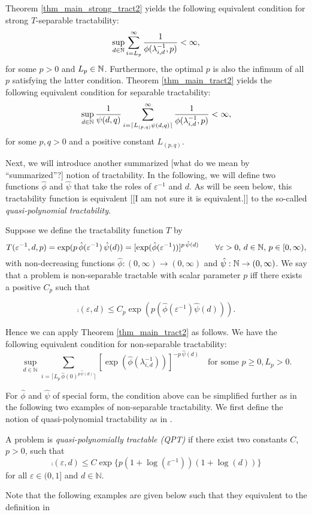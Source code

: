 \documentclass[sort&compress]{elsarticle}
\newcommand{\peter}[1]{\begingroup\color{violet}#1\endgroup}
\newcommand{\kachi}[1]{\begingroup\color{ForestGreen}#1\endgroup}
\begin{document}
\begin{example}
Theorem \ref{thm_main_strong_tract2} yields the following equivalent condition for strong $T$-separable tractability:
\begin{equation*} \label{eq:strong_tractiff}
     \sup_{d \in \mathbb{N}} \sum_{i = L_p}^\infty \frac{1}{\phi(\lambda_{i, d}^{-1},p)} < \infty,
\end{equation*}
for some $p>0$ and $L_p \in \mathbb{N}$. Furthermore, the optimal $p$ is also the infimum of all $p$ satisfying the latter condition.
Theorem \ref{thm_main_tract2} yields the following equivalent condition for separable tractability:
\[
 \sup_{d \in \mathbb{N}} \frac{1}{\psi(d,q)} \sum_{i = \lceil L_{(p,q)}\psi(d,q)\rceil}^\infty \frac{1}{\phi(\lambda_{i, d}^{-1},p)} < \infty,
\] for some $p,q >0$ and a positive constant $L_{(p,q)}$.
\end{example}
\kachi{Next, we will introduce another summarized \peter{[what do we mean by ``summarized''?]} notion of tractability. In the following, we will define two functions $\hat{\phi}$ and $\hat{\psi}$ that take the roles of $\varepsilon^{-1}$ and $d$. As will be seen below, this tractability function is equivalent \peter{[[I am not sure it is equivalent.]]} to the so-called \emph{quasi-polynomial tractability}.}
\
\begin{example}
    Suppose we define the tractability function $T$ by
\[
 T(\varepsilon^{-1},d,p)= \exp (p \, \hat{\phi}(\varepsilon^{-1})\, \hat{\psi}(d)) = [\exp( \hat{\phi}(\varepsilon^{-1}))]^{p \, \hat{\psi}(d)}
 \qquad \forall \varepsilon > 0, \,  d \in \mathbb{N}, \, p\in [0,\infty),
\]  with non-decreasing functions $\hat{\phi} : (0,\infty) \to (0,\infty)$ and $\hat{\psi} : \mathbb{N} \to (0,\infty)$.
We say that a problem is non-separable tractable with scalar parameter $p$ iff there exists a positive $C_{p}$ such that

\[\comp(\varepsilon,d)
\leq  C_{p}\exp (p(\hat{\phi}(\varepsilon^{-1})\hat{\psi}(d))).\]

Hence we can apply Theorem \ref{thm_main_tract2} as follows. We have the following equivalent condition for non-separable tractability:
\[
\sup_{d\in\mathbb{N}}\sum_{i=\lceil L_p\,\hat{\phi}(0)^{p \, \hat{\psi}(d)}\rceil} [\exp ( \hat{\phi}(\lambda_{i,d}^{-1}))]^{-p \, \hat{\psi}(d)}\quad \text{for some } p \geq 0, L_p >0.
\]

\end{example}
For $\hat{\phi}$ and $\hat{\psi}$ of special form, the condition above can be simplified further as in the following two examples of non-separable tractability.
\kachi{We first define the notion of quasi-polynomial tractability as in \cite{GneWoz11a}.
\begin{definition}
     A problem is \emph{quasi-polynomially tractable (QPT)} if there exist two constants $C$, $p > 0$, such that
\begin{equation}\label{expqpt}
    \comp(\varepsilon,d) \leq C\exp\{p(1+\log(\varepsilon^{-1}))(1+\log(d))\}
\end{equation}
for all $\varepsilon \in (0,1]$ and $d\in\mathbb{N}$.
\end{definition}
Note that the following examples are given below such that they equivalent to the definition in \cite{GneWoz11a}
}
\end{document}
